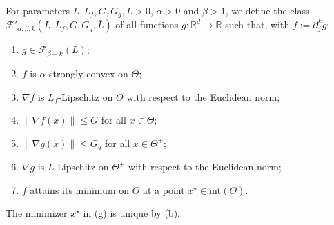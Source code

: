\documentclass{article}
\renewcommand{\leq}{\leqslant}
\theoremstyle{definition}
\begin{document}
For parameters $L,L_f,G,G_g,\bar{L}>0$, $\alpha>0$ and
$\beta>1$, we define the class
$\mathcal{F}'_{\alpha,\beta,k}(L,L_f,G,G_g,\bar{L})$ of all
functions $g:\mathbb{R}^d\to\mathbb{R}$ such that, with
$f:=\partial_j^k g$:
\begin{enumerate}
\item[(a)] $g\in\mathcal{F}_{\beta+k}(L)$;
\item[(b)] $f$ is $\alpha$-strongly convex on $\Theta$;
\item[(c)] $\nabla f$ is $L_f$-Lipschitz on $\Theta$ with respect to the Euclidean norm;
\item[(d)] $\|\nabla f(x)\|\leq G$ for all $x\in\Theta$;
\item[(e)] $\|\nabla g(x)\|\leq G_g$ for all $x\in\Theta^+$;
\item[(f)] $\nabla g$ is $\bar{L}$-Lipschitz on $\Theta^+$ with respect to the Euclidean norm;
\item[(g)] $f$ attains its minimum on $\Theta$ at a point
$x^\star\in\mathrm{int}(\Theta)$.
\end{enumerate}
The minimizer $x^\star$ in (g) is unique by (b).


\end{document}
